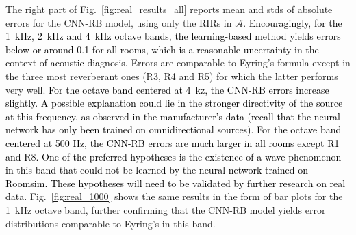 \documentclass[reprint]{JASA}
\makeatletter
\newif\ifnotes
\newcommand{\note}[1]{\@bsphack\ifnotes{#1}\fi\@esphack}
\makeatother
\begin{document}
The right part of Fig.~\ref{fig:real_results_all} reports mean and stds of absolute errors for the CNN-RB model, using only the RIRs in $\mathcal{A}$.
%
\note{\sout{Encouragingly, for the 1~kHz, 2~kHz and 4~kHz octave bands, the learning-based method yields errors comparable to Eyring's formula in almost all rooms, except the three most reverberant rooms (R3, R4 and R5) in which the latter performs very well.
		Means and stds of errors from both methods are below or around 0.1 for all rooms, which is a reasonable uncertainty in the context of acoustic diagnosis. However, CNN errors in the 500~Hz octave band are very large in all rooms except R1 and R8. This could be due to unforeseen discrepancies between simulated and real RIRs in this band, and needs further investigation. Fig.~\ref{fig:real_1000} shows the same results in the form of bar plots for the 1~kHz octave band only, further confirming that the CNN yields error distribution equivalent to Eyring's in most rooms.}}
%
%
\textcolor{black}{Encouragingly, for the 1~kHz, 2~kHz and 4~kHz octave bands, the learning-based method yields errors below or around 0.1 for all rooms, which is a reasonable uncertainty in the context of acoustic diagnosis.}
Errors are comparable to Eyring's formula except in the three most reverberant ones (R3, R4 and R5) for which the latter performs very well.
\textcolor{black}{For the octave band centered at 4~kz, the CNN-RB errors increase slightly. A possible explanation could lie in the stronger directivity of the source at this frequency, as observed in the manufacturer's data (recall that the neural network has only been trained on omnidirectional sources).  For the octave band centered at 500 Hz, the CNN-RB errors are much larger in all rooms except R1 and R8. One of the preferred hypotheses is the existence of a wave phenomenon in this band that could not be learned by the neural network trained on Roomsim.
	These hypotheses will need to be validated by further research on real data. }
Fig.~\ref{fig:real_1000} shows the same results in the form of bar plots for the 1~kHz octave band, further confirming that the CNN-RB model yields error distributions comparable to Eyring's in this band.
\end{document}
